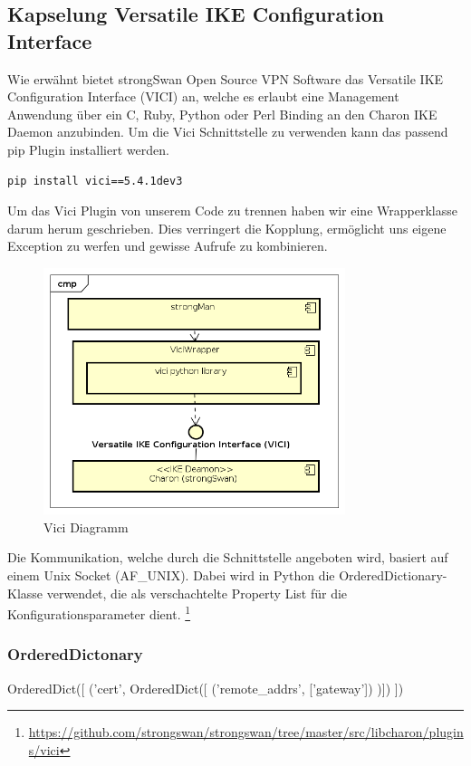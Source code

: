 \subsection{Kapselung Versatile
IKE Configuration Interface}
Wie erwähnt bietet strongSwan Open Source VPN Software das Versatile
IKE Configuration Interface (VICI) an, welche es erlaubt eine Management Anwendung über ein C, Ruby, Python oder Perl Binding an den Charon
IKE Daemon anzubinden.
\medskip
Um die Vici Schnittstelle zu verwenden kann das passend pip Plugin installiert werden.
\medskip
\begin{lstlisting}[style=BashInputStyle]
	pip install vici==5.4.1dev3
\end{lstlisting}
\medskip
Um das Vici Plugin von unserem Code zu trennen haben wir eine Wrapperklasse darum herum geschrieben. Dies verringert die Kopplung, ermöglicht uns eigene Exception zu werfen und gewisse Aufrufe zu kombinieren.
\medskip
\begin{figure}[H]
\centering
\includegraphics[width=250pt]{images/vici_wrapper.png}
\caption[Vici Diagramm]{Vici Diagramm}
\end{figure}
Die Kommunikation, welche durch die Schnittstelle angeboten wird, basiert auf einem Unix Socket (AF\_UNIX). Dabei wird in Python die OrderedDictionary-Klasse verwendet, die als verschachtelte Property List für die Konfigurationsparameter dient. \footnote{\url{https://github.com/strongswan/strongswan/tree/master/src/libcharon/plugins/vici}}

\subsubsection{OrderedDictonary}
\begin{python}
OrderedDict([
	('cert', OrderedDict([
		('remote_addrs', ['gateway'])
	)])
])
\end{python}
